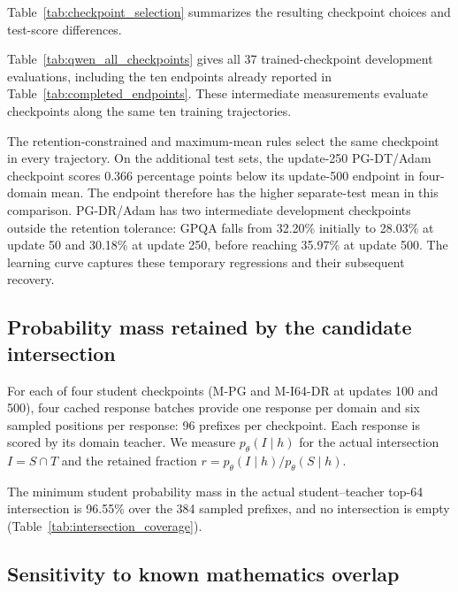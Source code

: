 Table~\ref{tab:checkpoint_selection} summarizes the resulting checkpoint choices and test-score differences.



Table~\ref{tab:qwen_all_checkpoints} gives all 37 trained-checkpoint development evaluations, including the ten endpoints already reported in Table~\ref{tab:completed_endpoints}. These intermediate measurements evaluate checkpoints along the same ten training trajectories.


The retention-constrained and maximum-mean rules select the same checkpoint in every trajectory. On the additional test sets, the update-250 PG-DT/Adam checkpoint scores 0.366 percentage points below its update-500 endpoint in four-domain mean. The endpoint therefore has the higher separate-test mean in this comparison. PG-DR/Adam has two intermediate development checkpoints outside the retention tolerance: GPQA falls from 32.20\% initially to 28.03\% at update 50 and 30.18\% at update 250, before reaching 35.97\% at update 500. The learning curve captures these temporary regressions and their subsequent recovery.

\subsection{Probability mass retained by the candidate intersection}
\label{app:actual_intersection_coverage}

For each of four student checkpoints (M-PG and M-I64-DR at updates 100 and 500), four cached response batches provide one response per domain and six sampled positions per response: 96 prefixes per checkpoint. Each response is scored by its domain teacher. We measure $p_\theta(I\mid h)$ for the actual intersection $I=S\cap T$ and the retained fraction $r=p_\theta(I\mid h)/p_\theta(S\mid h)$.



The minimum student probability mass in the actual student--teacher top-64 intersection is 96.55\% over the 384 sampled prefixes, and no intersection is empty (Table~\ref{tab:intersection_coverage}).

\subsection{Sensitivity to known mathematics overlap}
\label{app:math_overlap_sensitivity}

